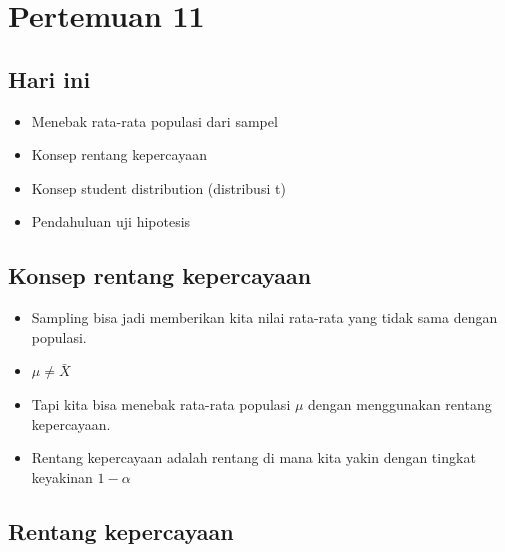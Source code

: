 \documentclass[
  letterpaper,
  DIV=11,
  numbers=noendperiod]{scrartcl}
\begin{document}
\section{Pertemuan 11}\label{pertemuan-11}

\subsection{Hari ini}\label{hari-ini-1}

\begin{itemize}
\item
  Menebak rata-rata populasi dari sampel
\item
  Konsep rentang kepercayaan
\item
  Konsep student distribution (distribusi t)
\item
  Pendahuluan uji hipotesis
\end{itemize}

\subsection{Konsep rentang
kepercayaan}\label{konsep-rentang-kepercayaan}

\begin{itemize}
\item
  Sampling bisa jadi memberikan kita nilai rata-rata yang tidak sama
  dengan populasi.
\item
  \(\mu \neq \bar{X}\)
\item
  Tapi kita bisa menebak rata-rata populasi \(\mu\) dengan menggunakan
  rentang kepercayaan.
\item
  Rentang kepercayaan adalah rentang di mana kita yakin dengan tingkat
  keyakinan \(1-\alpha\)
\end{itemize}

\subsection{Rentang kepercayaan}\label{rentang-kepercayaan}
\end{document}
